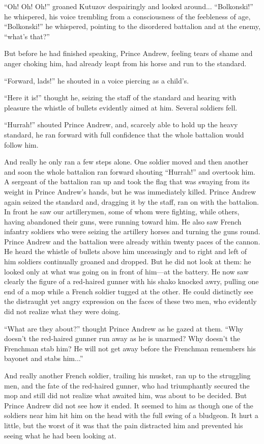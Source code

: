 ``Oh! Oh! Oh!'' groaned Kutuzov despairingly and looked around...
``Bolkonski!'' he whispered, his voice trembling from a
consciousness of the feebleness of age, ``Bolkonski!'' he
whispered, pointing to the disordered battalion and at the enemy,
``what's that?''

But before he had finished speaking, Prince Andrew, feeling tears
of shame and anger choking him, had already leapt from his horse
and run to the standard.

``Forward, lads!'' he shouted in a voice piercing as a child's.

``Here it is!'' thought he, seizing the staff of the standard and
hearing with pleasure the whistle of bullets evidently aimed at
him. Several soldiers fell.

``Hurrah!'' shouted Prince Andrew, and, scarcely able to hold up
the heavy standard, he ran forward with full confidence that the
whole battalion would follow him.

And really he only ran a few steps alone. One soldier moved and
then another and soon the whole battalion ran forward shouting
``Hurrah!'' and overtook him. A sergeant of the battalion ran up
and took the flag that was swaying from its weight in Prince
Andrew's hands, but he was immediately killed. Prince Andrew
again seized the standard and, dragging it by the staff, ran on
with the battalion. In front he saw our artillerymen, some of
whom were fighting, while others, having abandoned their guns,
were running toward him. He also saw French infantry soldiers who
were seizing the artillery horses and turning the guns
round. Prince Andrew and the battalion were already within twenty
paces of the cannon. He heard the whistle of bullets above him
unceasingly and to right and left of him soldiers continually
groaned and dropped. But he did not look at them: he looked only
at what was going on in front of him---at the battery. He now saw
clearly the figure of a red-haired gunner with his shako knocked
awry, pulling one end of a mop while a French soldier tugged at
the other. He could distinctly see the distraught yet angry
expression on the faces of these two men, who evidently did not
realize what they were doing.

``What are they about?'' thought Prince Andrew as he gazed at
them. ``Why doesn't the red-haired gunner run away as he is
unarmed? Why doesn't the Frenchman stab him? He will not get away
before the Frenchman remembers his bayonet and stabs him...''

And really another French soldier, trailing his musket, ran up to
the struggling men, and the fate of the red-haired gunner, who
had triumphantly secured the mop and still did not realize what
awaited him, was about to be decided. But Prince Andrew did not
see how it ended. It seemed to him as though one of the soldiers
near him hit him on the head with the full swing of a
bludgeon. It hurt a little, but the worst of it was that the pain
distracted him and prevented his seeing what he had been looking
at.

